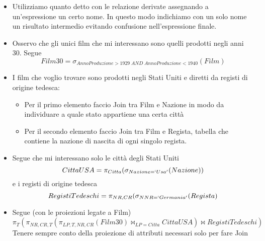 \begin{itemize}
	\item Utilizziamo quanto detto con le relazione derivate assegnando a un'espressione un certo nome. In questo modo indichiamo con un solo nome un risultato intermedio evitando confusione nell'espressione finale.
	\item Osservo che gli unici film che mi interessano sono quelli prodotti negli anni 30. Segue
	\[Film30 = \sigma_{AnnoProduzione > 1929\;AND\;AnnoProduzione < 1940}(Film)\]
	\item I film che voglio trovare sono prodotti negli Stati Uniti e diretti da registi di origine tedesca:
	\begin{itemize}
		\item Per il primo elemento faccio Join tra Film e Nazione in modo da individuare a quale stato appartiene una certa città
		\item Per il secondo elemento faccio Join tra Film e Regista, tabella che contiene la nazione di nascita di ogni singolo regista.
	\end{itemize}
	\item Segue che mi interessano solo le città degli Stati Uniti
	\[CittaUSA = \pi_{Citta}(\sigma_{Nazione = `Usa'}(Nazione))\]
	e i registi di origine tedesca
	\[RegistiTedeschi = \pi_{NR,CR}(\sigma_{NNR = `Germania' }(Regista)\]
	\item Segue (con le proiezioni legate a Film)
	\[\pi_{T}(\pi_{NR,CR,T}(\pi_{LP, T, NR, CR} (Film30) \Join_{LP=Citta} CittaUSA) \Join RegistiTedeschi)\]
	Tenere sempre conto della proiezione di attributi necessari solo per fare Join
\end{itemize}